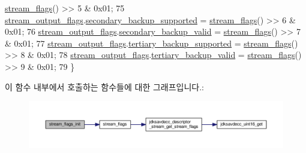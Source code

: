 \begin{DoxyCode}
      \hyperlink{classavdecc__lib_1_1stream__output__descriptor__response__imp_ae2c7ef21d6748f8c665984ab3328f75f}{stream\_flags}() >> 5 & 0x01;
75     \hyperlink{classavdecc__lib_1_1stream__output__descriptor__response__imp_a46da0a71335bf6463cafb4c34ac12e27}{stream\_output\_flags}.\hyperlink{structavdecc__lib_1_1stream__output__descriptor__response__imp_1_1stream__output__desc__stream__flags_a36275e9f64d4405dee0caebe993b7bf4}{secondary\_backup\_supported} = 
      \hyperlink{classavdecc__lib_1_1stream__output__descriptor__response__imp_ae2c7ef21d6748f8c665984ab3328f75f}{stream\_flags}() >> 6 & 0x01;
76     \hyperlink{classavdecc__lib_1_1stream__output__descriptor__response__imp_a46da0a71335bf6463cafb4c34ac12e27}{stream\_output\_flags}.\hyperlink{structavdecc__lib_1_1stream__output__descriptor__response__imp_1_1stream__output__desc__stream__flags_ad57da73c72dd7cfbd155f90f283be4be}{secondary\_backup\_valid} = 
      \hyperlink{classavdecc__lib_1_1stream__output__descriptor__response__imp_ae2c7ef21d6748f8c665984ab3328f75f}{stream\_flags}() >> 7 & 0x01;
77     \hyperlink{classavdecc__lib_1_1stream__output__descriptor__response__imp_a46da0a71335bf6463cafb4c34ac12e27}{stream\_output\_flags}.\hyperlink{structavdecc__lib_1_1stream__output__descriptor__response__imp_1_1stream__output__desc__stream__flags_abe8326a322f6549302ff36e93b6592b3}{tertiary\_backup\_supported} = 
      \hyperlink{classavdecc__lib_1_1stream__output__descriptor__response__imp_ae2c7ef21d6748f8c665984ab3328f75f}{stream\_flags}() >> 8 & 0x01;
78     \hyperlink{classavdecc__lib_1_1stream__output__descriptor__response__imp_a46da0a71335bf6463cafb4c34ac12e27}{stream\_output\_flags}.\hyperlink{structavdecc__lib_1_1stream__output__descriptor__response__imp_1_1stream__output__desc__stream__flags_a7426502da296e440f798a0b55509e7e5}{tertiary\_backup\_valid} = 
      \hyperlink{classavdecc__lib_1_1stream__output__descriptor__response__imp_ae2c7ef21d6748f8c665984ab3328f75f}{stream\_flags}() >> 9 & 0x01;
79 \}
\end{DoxyCode}


이 함수 내부에서 호출하는 함수들에 대한 그래프입니다.\+:
\nopagebreak
\begin{figure}[H]
\begin{center}
\leavevmode
\includegraphics[width=350pt]{classavdecc__lib_1_1stream__output__descriptor__response__imp_a61edd2027d6d2e089f949076cc966006_cgraph}
\end{center}
\end{figure}




